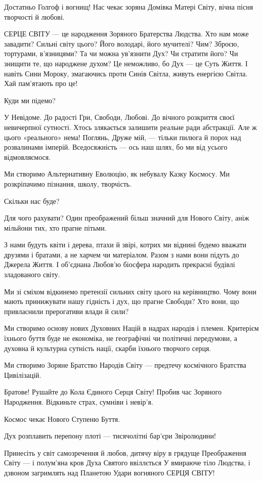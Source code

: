 Достатньо Голгоф і вогнищ! Нас чекає зоряна Домівка Матері Світу, вічна пісня
творчості й любові.

СЕРЦЕ СВІТУ — це народження Зоряного Братерства Людства. Хто нам може завадити?
Сильні світу цього? Його володарі, його мучителі? Чим? Зброєю, тортурами,
в’язницями? Та чи можна ув’язнити Дух? Чи стратити його? Чи знищити те, що
народжене духом? Це неможливо, бо Дух — це Суть Життя. І навіть Сини Мороку,
змагаючись проти Синів Світла, живуть енергією Світла. Хай пам’ятають про це!

Куди ми підемо?

У Невідоме. До радості Гри, Свободи, Любові. До вічного розкриття своєї
невичерпної сутності. Хтось злякається залишити реальне ради абстракції. Але ж
цього «реального» нема! Поглянь, Друже мій, — тільки пилюга й порох над
розвалинами імперій. Вседосяжність — ось наш шлях, бо ми від усього
відмовляємося.

Ми створимо Альтернативну Еволюцію, як небувалу Казку Космосу. Ми розкріпачимо
пізнання, школу, творчість.

Скільки нас буде?

Для чого рахувати? Один преображений більш значний для Нового Світу, аніж
мільйони тих, хто прагне пітьми.

З нами будуть квіти і дерева, птахи й звірі, котрих ми віднині будемо вважати
друзями і братами, а не харчем чи матеріалом. Разом з нами вони підуть до
Джерела Життя. І об’єднана Любов’ю біосфера народить прекрасні будівлі
зладованого світу.

Ми зі сміхом відкинемо претензії сильних світу цього на керівництво. Чому вони
мають принижувати нашу гідність і дух, що прагне Свободи? Хто вони, що
привласнили прерогативи влади й сили?

Ми створимо основу нових Духовних Націй в надрах народів і племен. Критерієм
їхнього буття буде не економіка, не географічні чи політичні передумови, а
духовна й культурна сутність нації, скарби їхнього творчого серця.

Ми створимо Зоряне Братство Народів Світу — предтечу космічного Братства
Цивілізацій.

Братове! Рушайте до Кола Єдиного Серця Світу! Пробив час Зоряного Народження.
Відкиньте страх, сумніви і невір’я.

Космос чекає Нового Ступеню Буття.

Дух розплавить перепону плоті — тисячолітні бар’єри Звіролюдини!

Принесіть у світ самозречення й любов, дитячу віру в грядуще Преображення Світу
— і полум’яна кров Духа Святого ввіллється У вмираюче тіло Людства, і дзвоном
загримлять над Планетою Удари вогняного СЕРЦЯ СВІТУ!

